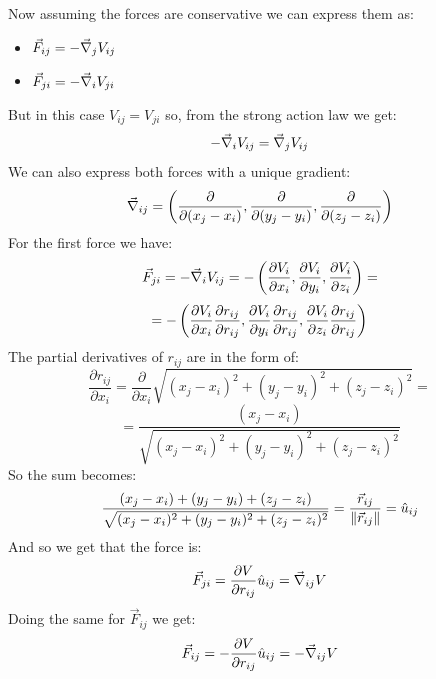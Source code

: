 Now assuming the forces are conservative we can express them as:
\begin{itemize}
    \item $\vec{F}_{ij}= -\vec{\nabla}_{j}V_{ij}$
    \item $\vec{F}_{ji}= -\vec{\nabla}_{i}V_{ji}$
\end{itemize}
But in this case $V_{ij}=V_{ji}$ so, from the strong action law we get:
\begin{equation}
    -\vec{\nabla}_iV_{ij}=\vec{\nabla}_jV_{ij}
\end{equation}
We can also express both forces with a unique gradient:
\begin{equation}
    \vec{\nabla}_{ij} = \left(\dfrac{\partial}{\partial(x_j-x_i)},\dfrac{\partial}{\partial(y_j-y_i)},\dfrac{\partial}{\partial(z_j-z_i)}\right)
\end{equation}
For the first force we have:
\begin{equation}
    \vec{F}_{ji}=-\vec{\nabla}_iV_{ij}=-\left(\dfrac{\partial V_i}{\partial x_i },\dfrac{\partial V_i}{\partial y_i },\dfrac{\partial V_i}{\partial z_i }\right) =
\end{equation}
\begin{equation}
    =-\left(\dfrac{\partial V_i}{\partial x_i}\dfrac{\partial r_{ij}}{\partial r_{ij}},\dfrac{\partial V_i}{\partial y_i }\dfrac{\partial r_{ij}}{\partial r_{ij}},\dfrac{\partial V_i}{\partial z_i }\dfrac{\partial r_{ij}}{\partial r_{ij}}\right)
\end{equation}
The partial derivatives of $r_{ij}$ are in the form of:
\begin{equation}
    \dfrac{\partial r_{ij}}{\partial x_i} = \dfrac{\partial }{\partial x_i}\sqrt{(x_j-x_i)^2 + (y_j-y_i)^2+ (z_j-z_i)^2} =
\end{equation}
\begin{equation}
    = \dfrac{(x_j-x_i)}{\sqrt{(x_j-x_i)^2 + (y_j-y_i)^2+ (z_j-z_i)^2}}
\end{equation}
So the sum becomes:
\begin{equation}
    \dfrac{(x_j-x_i)+(y_j-y_i)+(z_j-z_i)}{\sqrt{(x_j-x_i)^2 + (y_j-y_i)^2+ (z_j-z_i)^2}} = \dfrac{\vec{r}_{ij}}{\norm{\vec{r}_{ij}}} = \hat{u}_{ij}
\end{equation}
And so we get that the force is:
\begin{equation}
    \vec{F}_{ji}= \dfrac{\partial V}{\partial r_{ij}}\hat{u}_{ij} = \vec{\nabla}_{ij}V
\end{equation}
Doing the same for $\vec{F}_{ij}$ we get:
\begin{equation}
    \vec{F}_{ij}= -\dfrac{\partial V}{\partial r_{ij}}\hat{u}_{ij}= -\vec{\nabla}_{ij}V
\end{equation}
